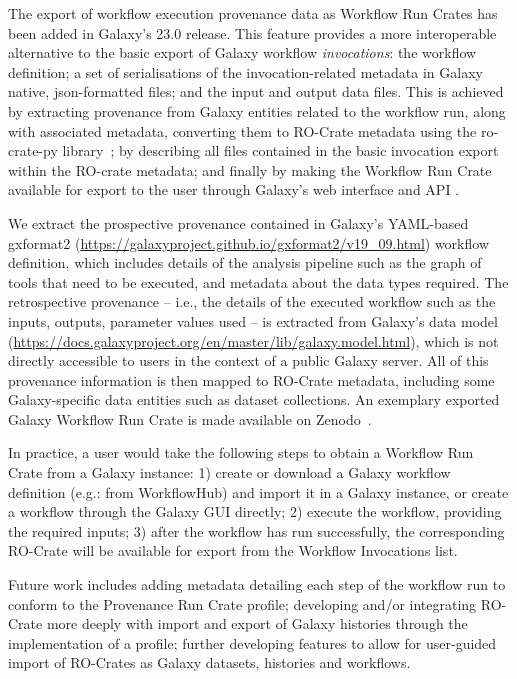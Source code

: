 \documentclass[10pt,letterpaper]{article}
\begin{document}
The export of workflow execution provenance data as Workflow Run Crates has been added in Galaxy's 23.0 release.
This feature provides a more interoperable alternative to the basic export of Galaxy workflow
\emph{invocations}: the workflow definition; a set of serialisations of the invocation-related metadata in Galaxy native, json-formatted files;
and the input and output data files.
This is achieved by extracting provenance from Galaxy entities related to the workflow run, along with associated metadata, converting them to RO-Crate metadata using the ro-crate-py library~\cite{De Geest 2022a}; by describing all files contained in the basic invocation export within the RO-crate metadata;
and finally by making the Workflow Run Crate available for export to the user through Galaxy's web interface and API \cite{De Geest 2022b}.

We extract the prospective provenance contained in Galaxy's YAML-based gxformat2
(\url{https://galaxyproject.github.io/gxformat2/v19_09.html}) workflow definition, which includes details of the analysis pipeline such as the graph of tools that need to be executed, and metadata about the data types required.
The retrospective provenance -- i.e., the details of the executed workflow such as the inputs, outputs, parameter values used -- is extracted from Galaxy's data model (\url{https://docs.galaxyproject.org/en/master/lib/galaxy.model.html}), which is not directly accessible to users in the context of a public Galaxy server.
All of this provenance information is then mapped to RO-Crate metadata, including some Galaxy-specific data entities such as dataset collections.
An exemplary exported Galaxy Workflow Run Crate is made available on Zenodo~\cite{De Geest 2023}.

In practice, a user would take the following steps to obtain a Workflow Run Crate from a Galaxy instance: 1) create or download a Galaxy workflow definition (e.g.: from WorkflowHub) and import it in a Galaxy instance, or create a workflow through the Galaxy GUI directly; 2) execute the workflow, providing the required inputs; 3) after the workflow has run successfully, the corresponding RO-Crate will be available for export from the Workflow Invocations list.

Future work includes adding metadata detailing each step of the workflow run to conform to the Provenance Run Crate profile; developing and/or integrating RO-Crate more deeply with import and export of Galaxy histories through the implementation of a profile; further developing features to allow for user-guided import of RO-Crates as Galaxy datasets, histories and workflows.
\end{document}
